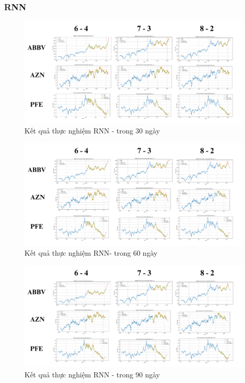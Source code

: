\documentclass[conference]{IEEEtran}
\begin{document}
\subsubsection{RNN}
\begin{figure}[H]
    \centering
    \begin{minipage}{0.5\textwidth}
    \centering
    \includegraphics[width=1\textwidth]{Image/RNN30.png}
    \caption{Kết quả thực nghiệm RNN - trong 30 ngày}
    \label{fig:1}
    \end{minipage}
\end{figure}
\begin{figure}[H]
    \centering
    \begin{minipage}{0.5\textwidth}
    \centering
    \includegraphics[width=1\textwidth]{Image/RNN60.png}
    \caption{Kết quả thực nghiệm RNN- trong 60 ngày}
    \label{fig:1}
    \end{minipage}
\end{figure}
\begin{figure}[H]
    \centering
    \begin{minipage}{0.5\textwidth}
    \centering
    \includegraphics[width=1\textwidth]{Image/RNN90.png}
    \caption{Kết quả thực nghiệm RNN - trong 90 ngày}
    \label{fig:1}
    \end{minipage}
\end{figure}
\end{document}
